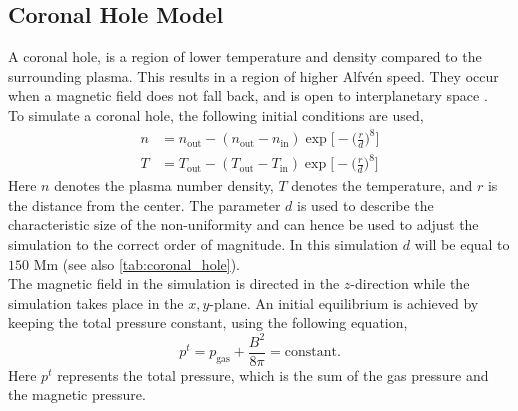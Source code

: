 \documentclass{article}
\begin{document}
\subsection{Coronal Hole Model}
A coronal hole, is a region of lower temperature and density compared to the surrounding plasma. This results in a region of higher Alfv\'en speed. They occur when a magnetic field does not fall back, and is open to interplanetary space .\\

To simulate a coronal hole, the following initial conditions are used,
\begin{align*}
    n &= n_{\text{out}} - (n_{\text{out}}-n_{\text{in}})\exp\bigg[-\bigg(\frac{r}{d}\bigg)^8\bigg]\\
    T &= T_{\text{out}} - (T_{\text{out}}-T_{\text{in}})\exp\bigg[-\bigg(\frac{r}{d}\bigg)^8\bigg]
\end{align*}
Here $n$ denotes the plasma number density, $T$ denotes the temperature, and $r$ is the distance from the center. The parameter $d$ is used to describe the characteristic size of the non-uniformity and can hence be used to adjust the simulation to the correct order of magnitude. In this simulation $d$ will be equal to $150$ Mm (see also \cref{tab:coronal_hole}).\\

The magnetic field in the simulation is directed in the $z$-direction while the simulation takes place in the $x,y$-plane. An initial equilibrium is achieved by keeping the total pressure constant, using the following equation,
\begin{equation*}
    p^t = p_{\text{gas}} + \frac{B^2}{8\pi} = \text{constant}.
\end{equation*}
Here $p^t$ represents the total pressure, which is the sum of the gas pressure and the magnetic pressure. \\
\end{document}
